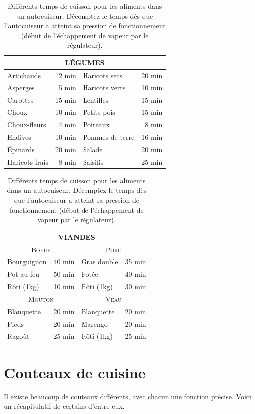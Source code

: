 \documentclass[a4paper,twoside]{report}
\begin{document}
\begin{table}[htb]
\centering
\begin{tabular}{|l|r||l|r|}
\hline
\multicolumn{4}{|c|}{\textbf{LÉGUMES}}\\\hline
Artichauds & 12 min & Haricots secs & 20 min\\\hline
Asperges & 5 min & Haricots verts & 10 min\\\hline
Carottes & 15 min & Lentilles & 15 min\\\hline
Choux & 10 min & Petits-pois & 15 min\\\hline
Choux-fleurs & 4 min & Poireaux & 8 min\\\hline
Endives & 10 min & Pommes de terre & 16 min\\\hline
Épinards & 20 min & Salade & 20 min\\\hline
Haricots frais & 8 min & Salsifis & 25 min\\\hline
\end{tabular}

\bigskip

\begin{tabular}{|l|r||l|r|}
\hline
\multicolumn{4}{|c|}{\textbf{VIANDES}}\\\hline
\multicolumn{2}{|c||}{\textsc{Boeuf}} & \multicolumn{2}{c|}{\textsc{Porc}}\\\hline
Bourguignon & 40 min & Gras double & 35 min\\\hline
Pot au feu & 50 min & Potée & 40 min\\\hline
Rôti (1kg) & 10 min & Rôti (1kg) & 30 min\\\hline
\multicolumn{2}{|c||}{\textsc{Mouton}} & \multicolumn{2}{c|}{\textsc{Veau}}\\\hline
Blanquette & 20 min & Blanquette & 20 min\\\hline
Pieds & 20 min & Marengo & 20 min\\\hline
Ragoût & 25 min & Rôti (1kg) & 25 min\\\hline
\end{tabular}

\caption{Différents temps de cuisson pour les aliments dans un autocuiseur. Décomptez le temps dès que l'autocuiseur a atteint sa pression de fonctionnement (début de l'échappement de vapeur par le régulateur).}\label{tab:cuisson_autocuiseur}
\end{table}

\section{Couteaux de cuisine}
Il existe beaucoup de couteaux différents, avec chacun une fonction précise. Voici un récapitulatif de certains d'entre eux.
\end{document}
